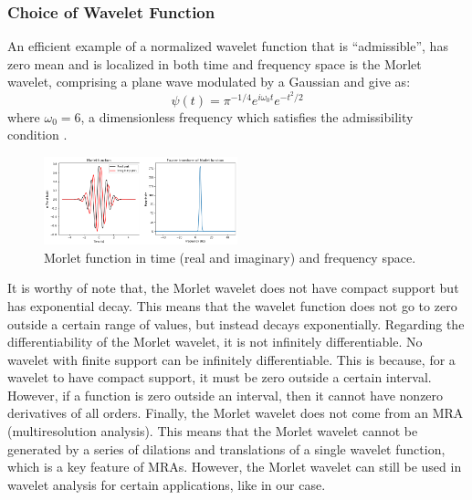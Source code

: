 \documentclass[conference]{IEEEtran}
\begin{document}
\subsubsection{Choice of Wavelet Function}An efficient example of a normalized wavelet function that is “admissible”, has zero mean and is localized in both time and frequency space is the Morlet wavelet, comprising a plane wave modulated by a Gaussian \cite{doi:10.1146/annurev.fl.24.010192.002143}\cite{mertins1999signal}\cite{APracticalGuidetoWaveletAnalysis} and give as:\begin{equation} \psi(t)= \pi^{-1/4}e^{i\omega_{0}t}e^{-t^2/2}\end{equation}where $\omega_{0}=6$, a dimensionless frequency which satisfies the admissibility condition \cite{doi:10.1146/annurev.fl.24.010192.002143}\cite{mertins1999signal}\cite{APracticalGuidetoWaveletAnalysis}.
\begin{figure}[h]
\centering\includegraphics[width=0.5\textwidth]{Morlet_Plot_Python.png}
\caption{Morlet function in time (real and imaginary) and frequency space.} 
\label{fig:my_label}
\end{figure}
It is worthy of note that, the Morlet wavelet does not have compact support but has exponential decay. This means that the wavelet function does not go to zero outside a certain range of values, but instead decays exponentially. Regarding the differentiability of the Morlet wavelet, it is not infinitely differentiable. No wavelet with finite support can be infinitely differentiable. This is because, for a wavelet to have compact support, it must be zero outside a certain interval. However, if a function is zero outside an interval, then it cannot have nonzero derivatives of all orders.
Finally, the Morlet wavelet does not come from an MRA (multiresolution analysis). This means that the Morlet wavelet cannot be generated by a series of dilations and translations of a single wavelet function, which is a key feature of MRAs. However, the Morlet wavelet can still be used in wavelet analysis for certain applications, like in our case.
\end{document}

